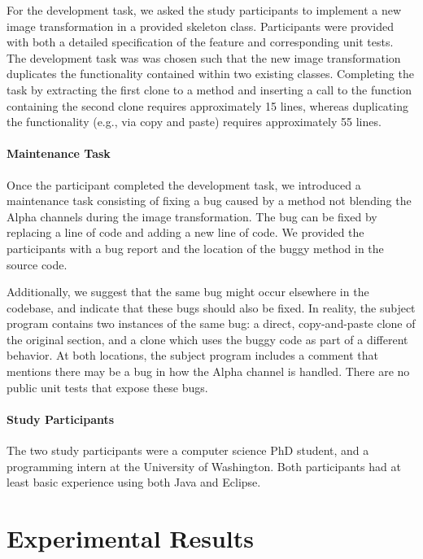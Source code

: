 \documentclass[nocopyrightspace,10pt]{sigplanconf}
\begin{document}
For the development task, we asked the study participants to implement
a new image transformation in a provided skeleton class. Participants
were provided with both a detailed specification of the feature and
corresponding unit tests. The development task was was chosen such
that the new image transformation duplicates the functionality
contained within two existing classes. Completing the task by extracting 
the first clone to a method and inserting a call to the function containing 
the second clone requires approximately 15 lines, whereas
duplicating the functionality (e.g., via copy and paste) requires
approximately 55 lines.

\paragraph{Maintenance Task}

Once the participant completed the development task, we introduced a
maintenance task consisting of fixing a bug caused by a method not
blending the Alpha channels during the image transformation. The bug
can be fixed by replacing a line of code and adding a new line of
code. We provided the participants with a bug report and the location
of the buggy method in the source code.

Additionally, we suggest that the same bug might occur elsewhere in
the codebase, and indicate that these bugs should also be fixed.  In
reality, the subject program contains two instances of the same bug: a
direct, copy-and-paste clone of the original section, and a clone
which uses the buggy code as part of a different behavior.  At both
locations, the subject program includes a comment that mentions there
may be a bug in how the Alpha channel is handled. There are no public
unit tests that expose these bugs.

\paragraph{Study Participants}
The two study participants were a computer science PhD student, and a
programming intern at the University of Washington. Both participants
had at least basic experience using both Java and Eclipse.

\section{Experimental Results}

\end{document}
